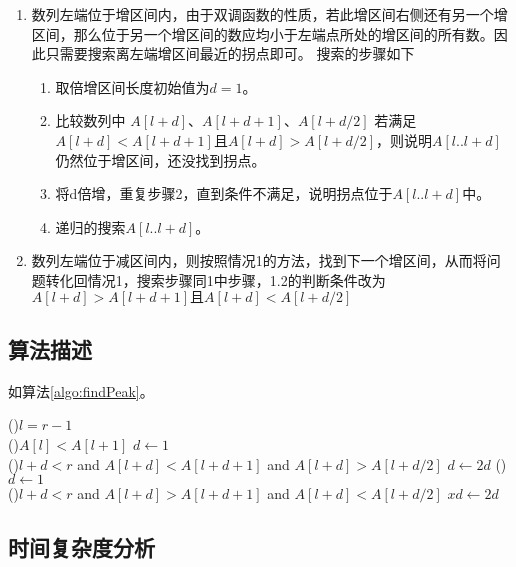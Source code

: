 \begin{enumerate}
    \item 数列左端位于增区间内，由于双调函数的性质，若此增区间右侧还有另一个增区间，那么位于另一个增区间的数应均小于左端点所处的增区间的所有数。因此只需要搜索离左端增区间最近的拐点即可。
    搜索的步骤如下\begin{enumerate}
        \item 取倍增区间长度初始值为$d = 1$。
        \item 比较数列中 $A[l + d]$、$A[l + d + 1]$、$A[l + d/2]$ 若满足$A[l + d] < A[l + d + 1] \text{且} A[l + d] > A[l + d/2]$，则说明$A[l..l+d]$仍然位于增区间，还没找到拐点。
        \item 将d倍增，重复步骤2，直到条件不满足，说明拐点位于$A[l..l+d]$中。
        \item 递归的搜索$A[l..l+d]$。
    \end{enumerate}
    \item 数列左端位于减区间内，则按照情况1的方法，找到下一个增区间，从而将问题转化回情况1，搜索步骤同1中步骤，1.2的判断条件改为$A[l + d] > A[l + d + 1] \text{且} A[l + d] < A[l + d/2]$
\end{enumerate}

\subsection*{算法描述}

如算法\ref{algo:findPeak}。\\

\begin{algorithm}[H]
    \caption{$findPeak(l, r)$}\label{algo:findPeak}
    \If(){$l=r-1$}{
        \\
    }
    \If(){$A[l] < A[l+1]$}{
        $d \leftarrow 1$\\
        \While(){$l+d < r $ and $A[l + d] < A[l + d + 1] $ and $ A[l + d] > A[l + d/2]$}{
            $d \leftarrow 2d$
        }
    }\Else(){
        $d \leftarrow 1$\\
        \While(){$l+d < r $ and $A[l + d] > A[l + d + 1] $ and $ A[l + d] < A[l + d/2]$}{
            $xd \leftarrow 2d$
        }
    }
\end{algorithm}

\subsection*{时间复杂度分析}

